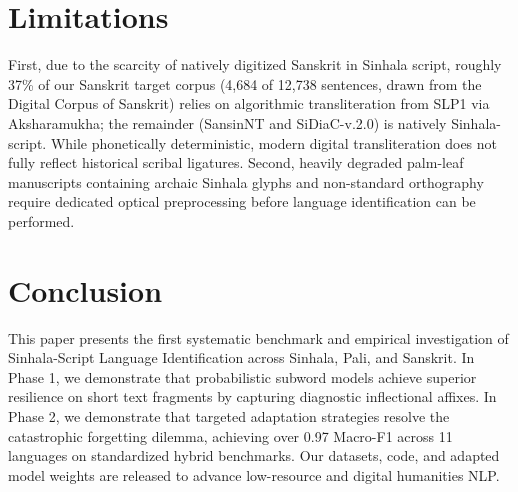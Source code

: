 \documentclass[11pt]{article}
\begin{document}
\section{Limitations}
First, due to the scarcity of natively digitized Sanskrit in Sinhala script, roughly 37\% of our Sanskrit target corpus (4,684 of 12,738 sentences, drawn from the Digital Corpus of Sanskrit) relies on algorithmic transliteration from SLP1 via Aksharamukha; the remainder (SansinNT and SiDiaC-v.2.0) is natively Sinhala-script. While phonetically deterministic, modern digital transliteration does not fully reflect historical scribal ligatures. Second, heavily degraded palm-leaf manuscripts containing archaic Sinhala glyphs and non-standard orthography require dedicated optical preprocessing before language identification can be performed.

\section{Conclusion}
This paper presents the first systematic benchmark and empirical investigation of Sinhala-Script Language Identification across Sinhala, Pali, and Sanskrit. In Phase 1, we demonstrate that probabilistic subword models achieve superior resilience on short text fragments by capturing diagnostic inflectional affixes. In Phase 2, we demonstrate that targeted adaptation strategies resolve the catastrophic forgetting dilemma, achieving over 0.97 Macro-F1 across 11 languages on standardized hybrid benchmarks. Our datasets, code, and adapted model weights are released to advance low-resource and digital humanities NLP.
\end{document}
